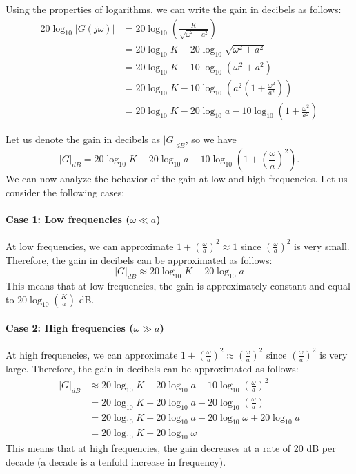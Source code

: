 \documentclass{ee122_notes}
\begin{document}
Using the properties of logarithms, we can write the gain in decibels as follows:
\begin{align*}
20 \log_{10} |G(j\omega)| &= 20 \log_{10} \left(\frac{K}{\sqrt{\omega^2 + a^2}}\right) \\
&= 20 \log_{10} K - 20 \log_{10} \sqrt{\omega^2 + a^2} \\
&= 20 \log_{10} K - 10 \log_{10} (\omega^2 + a^2)\\
&= 20 \log_{10} K - 10 \log_{10} (a^2 (1 + \frac{\omega^2}{a^2})) \\
&= 20 \log_{10} K - 20 \log_{10} a - 10 \log_{10} (1 + \frac{\omega^2}{a^2})
\end{align*}

Let us denote the gain in decibels as \( |G|_{dB}\), so we have 
\[ 
|G|_{dB} = 20 \log_{10} K - 20 \log_{10} a - 10 \log_{10} \left(1 + \left(\frac{\omega}{a}\right)^2\right).
\] 
We can now analyze the behavior of the gain at low and high frequencies. Let us consider the following cases:
\paragraph{Case 1: Low frequencies ($\omega \ll a$)}
At low frequencies, we can approximate \( 1 + \left(\frac{\omega}{a}\right)^2 \approx 1 \) since \( \left(\frac{\omega}{a}\right)^2 \) is very small. Therefore, the gain in decibels can be approximated as follows:
\[
|G|_{dB} \approx 20 \log_{10} K - 20 \log_{10} a
\]
This means that at low frequencies, the gain is approximately constant and equal to \( 20 \log_{10} \left(\frac{K}{a}\right) \) dB.
\paragraph{Case 2: High frequencies ($\omega \gg a$)}
At high frequencies, we can approximate \( 1 + \left(\frac{\omega}{a}\right)^2 \approx \left(\frac{\omega}{a}\right)^2 \) since \( \left(\frac{\omega}{a}\right)^2 \) is very large. Therefore, the gain in decibels can be approximated as follows:
\begin{align*}
|G|_{dB} &\approx 20 \log_{10} K - 20 \log_{10} a - 10 \log_{10} \left(\frac{\omega}{a}\right)^2 \\
&= 20 \log_{10} K - 20 \log_{10} a - 20 \log_{10} \left(\frac{\omega}{a}\right) \\
&= 20 \log_{10} K - 20 \log_{10} a - 20 \log_{10} \omega + 20 \log_{10} a \\
&= 20 \log_{10} K - 20 \log_{10} \omega
\end{align*}
This means that at high frequencies, the gain decreases at a rate of 20 dB per decade (a decade is a tenfold increase in frequency).
\end{document}
